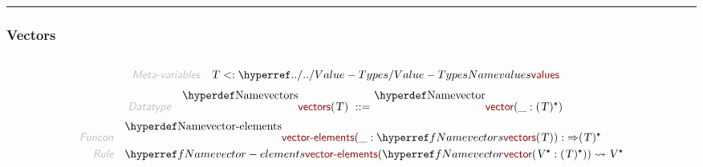 

\begin{center}
\rule{3in}{0.4pt}
\end{center}

\subsubsection{Vectors}\hypertarget{vectors}{}\label{vectors}

\begin{align*}
  [ \
  \KEY{Datatype} \quad & \NAMEREF{vectors} \\
  \KEY{Funcon} \quad & \NAMEREF{vector} \\
  \KEY{Funcon} \quad & \NAMEREF{vector-elements}
  \ ]
\end{align*}
\begin{align*}
  \KEY{Meta-variables} \quad
  & \VAR{T} <: \NAMEHYPER{../..}{Value-Types}{values}
\end{align*}
\begin{align*}
  \KEY{Datatype} \quad 
  \NAMEDECL{vectors}(
                     \VAR{T} ) 
  \ ::= \ & \NAMEDECL{vector}(
                               \_ : (  \VAR{T} )\STAR)
\end{align*}
\begin{align*}
  \KEY{Funcon} \quad
  & \NAMEDECL{vector-elements}(
                       \_ : \NAMEREF{vectors}
                                 (  \VAR{T} )) 
    :  \TO (  \VAR{T} )\STAR 
\\
  \KEY{Rule} \quad
    & \NAMEREF{vector-elements}
        (  \NAMEREF{vector}
                (  \VAR{V}\STAR : (  \VAR{T} )\STAR ) ) \leadsto 
        \VAR{V}\STAR
\end{align*}


